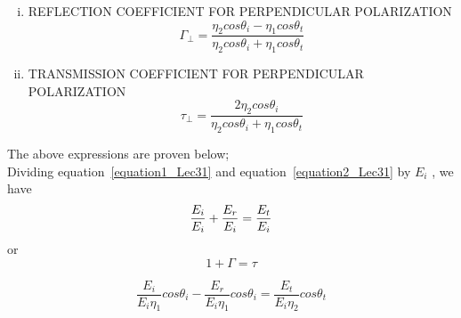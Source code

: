 \begin{enumerate}[(i)]
\item REFLECTION COEFFICIENT FOR PERPENDICULAR POLARIZATION
$$\Gamma_{\bot} = \frac{\eta_{2} cos\theta_{i} - \eta_{1} cos\theta_{t}}{\eta_{2} cos\theta_{i} + \eta_{1} cos\theta_{t}}$$
\item TRANSMISSION COEFFICIENT FOR PERPENDICULAR POLARIZATION
$$\tau_{\bot} = \frac{2 \eta_{2} cos\theta_{i}}{\eta_{2} cos\theta_{i} + \eta_{1} cos\theta_{t}}$$
\end{enumerate}
The above expressions are proven below;\\

Dividing equation~\ref{equation1_Lec31} and equation~\ref{equation2_Lec31} by $E_{i}$ , we have
\begin{equation*}
\centering
\frac{E_{i}}{E_{i}} + \frac{E_{r}}{E_{i}} = \frac{E_{t}}{E_{i}}
\end{equation*}
or
\begin{equation*}
	1 + \Gamma = \tau
\end{equation*}

\begin{equation*}
	\frac{E_{i}}{E_{i}\eta_{1}}cos\theta_{i} - \frac{E_{r}}{E_{i}\eta_{1}}cos\theta_{i} = \frac{E_{t}}{E_{i}\eta_{2}}cos\theta_{t}
\end{equation*}

